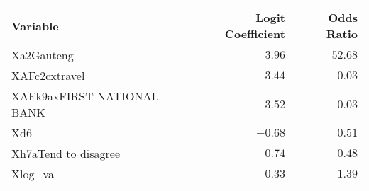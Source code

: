\begin{longtable}{lrr}
\toprule
Variable & Logit Coefficient & Odds Ratio \\ 
\midrule
Xa2Gauteng & $3.96$ & $52.68$ \\ 
XAFc2cxtravel & $-3.44$ & $0.03$ \\ 
XAFk9axFIRST NATIONAL BANK & $-3.52$ & $0.03$ \\ 
Xd6 & $-0.68$ & $0.51$ \\ 
Xh7aTend to disagree & $-0.74$ & $0.48$ \\ 
Xlog\_va & $0.33$ & $1.39$ \\ 
\bottomrule
\end{longtable}

